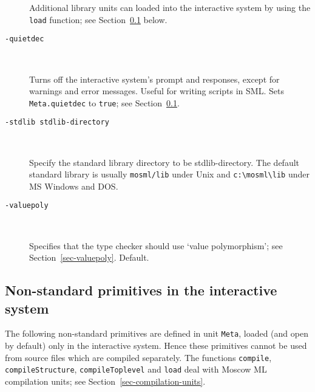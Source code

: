 \documentclass[fleqn,a4paper]{article}
\begin{document}
\begin{description}
  Additional library units can loaded into the interactive system by
  using the {\tt load} function; see
  Section~\ref{sec-nonstandard-interactive} below.

\item[{\tt -quietdec}]\mbox{ }
  
  Turns off the interactive system's prompt and responses, except for
  warnings and error messages.  Useful for writing scripts in SML\@.
  Sets {\tt Meta.quietdec} to {\tt true}; see
  Section~\ref{sec-nonstandard-interactive}.
  
\item[{\tt -stdlib {\rm stdlib-directory}}]\mbox{ }

  Specify the standard library directory to be stdlib-directory.  The
  default standard library is usually {\tt mosml/lib} under Unix and
  \verb#c:\mosml\lib# under MS Windows and DOS.

\item[{\tt -valuepoly}]\mbox{ }

  Specifies that the type checker should use `value polymorphism'; see
  Section~\ref{sec-valuepoly}.  Default.
\end{description}


\subsection{Non-standard primitives in the interactive system}
\label{sec-nonstandard-interactive}

The following non-standard primitives are defined in unit {\tt Meta},
loaded (and open by default) only in the interactive system.  Hence
these primitives cannot be used from source files which are compiled
separately.  The functions {\tt compile}, \texttt{compileStructure},
\texttt{compileToplevel} and {\tt load} deal with Moscow ML
compilation units; see Section~\ref{sec-compilation-units}.
\end{document}
